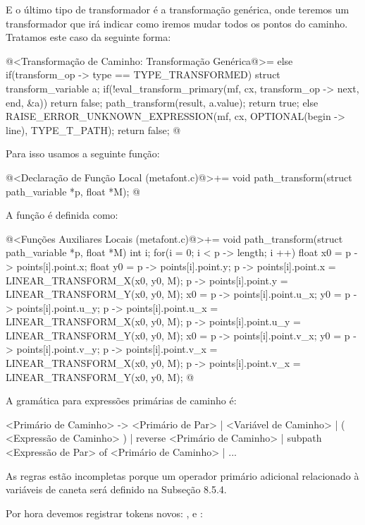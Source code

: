 {{{{{{E o último tipo de transformador é a transformação genérica, onde
teremos um transformador que irá indicar como iremos mudar todos os
pontos do caminho. Tratamos este caso da seguinte forma:

\iniciocodigo
@<Transformação de Caminho: Transformação Genérica@>=
else if(transform_op -> type == TYPE_TRANSFORMED){
  struct transform_variable a;
  if(!eval_transform_primary(mf, cx, transform_op -> next, end, &a))
    return false;
  path_transform(result, a.value);
  return true;
}
else{
  RAISE_ERROR_UNKNOWN_EXPRESSION(mf, cx, OPTIONAL(begin -> line), TYPE_T_PATH);
  return false;
}
@
\fimcodigo

Para isso usamos a seguinte função:

\iniciocodigo
@<Declaração de Função Local (metafont.c)@>+=
void path_transform(struct path_variable *p, float *M);
@
\fimcodigo

A função é definida como:

\iniciocodigo
@<Funções Auxiliares Locais (metafont.c)@>+=
void path_transform(struct path_variable *p, float *M){
  int i;
  for(i = 0; i < p -> length; i ++){
    float x0 = p -> points[i].point.x;
    float y0 = p -> points[i].point.y;
    p -> points[i].point.x = LINEAR_TRANSFORM_X(x0, y0, M);
    p -> points[i].point.y = LINEAR_TRANSFORM_Y(x0, y0, M);
    x0 = p -> points[i].point.u_x;
    y0 = p -> points[i].point.u_y;
    p -> points[i].point.u_x = LINEAR_TRANSFORM_X(x0, y0, M);
    p -> points[i].point.u_y = LINEAR_TRANSFORM_Y(x0, y0, M);
    x0 = p -> points[i].point.v_x;
    y0 = p -> points[i].point.v_y;
    p -> points[i].point.v_x = LINEAR_TRANSFORM_X(x0, y0, M);
    p -> points[i].point.v_x = LINEAR_TRANSFORM_Y(x0, y0, M);
  }
}
@
\fimcodigo


A gramática para expressões primárias de caminho é:

\alinhaverbatim
<Primário de Caminho> -> <Primário de Par> | <Variável de Caminho> |
                       ( <Expressão de Caminho> ) |
                       reverse <Primário de Caminho> |
                       subpath <Expressão de Par> of <Primário de Caminho> |
                       ...
\alinhanormal

As regras estão incompletas porque um operador primário adicional
relacionado à variáveis de caneta será definido na Subseção 8.5.4.

Por hora devemos registrar tokens
novos: ,  e :

}}}}}}

